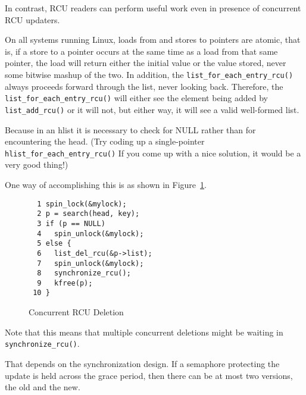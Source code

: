 In contrast, RCU readers can perform useful work even in presence
of concurrent RCU updaters.


On all systems running Linux, loads from and stores
to pointers are atomic, that is, if a store to a pointer occurs at
the same time as a load from that same pointer, the load will return
either the initial value or the value stored, never some bitwise mashup
of the two.
In addition, the {\tt list\_for\_each\_entry\_rcu()} always proceeds
forward through the list, never looking back.
Therefore, the {\tt list\_for\_each\_entry\_rcu()} will either see
the element being added by {\tt list\_add\_rcu()} or it will not,
but either way, it will see a valid well-formed list.


Because in an hlist it is necessary to check for
NULL rather than for encountering the head.
(Try coding up a single-pointer {\tt hlist\_for\_each\_entry\_rcu()}
If you come up with a nice solution, it would be a very good thing!)


One way of accomplishing this is as shown in
Figure~\ref{fig:defer:Concurrent RCU Deletion}.

\begin{figure}[htbp]
{ \centering
\begin{verbatim}
  1 spin_lock(&mylock);
  2 p = search(head, key);
  3 if (p == NULL)
  4   spin_unlock(&mylock);
  5 else {
  6   list_del_rcu(&p->list);
  7   spin_unlock(&mylock);
  8   synchronize_rcu();
  9   kfree(p);
 10 }
\end{verbatim}
}
\caption{Concurrent RCU Deletion}
\label{fig:defer:Concurrent RCU Deletion}
\end{figure}

Note that this means that multiple concurrent deletions might be
waiting in {\tt synchronize\_rcu()}.


That depends on the synchronization design.
If a semaphore protecting the update is held across the grace period,
then there can be at most two versions, the old and the new.

